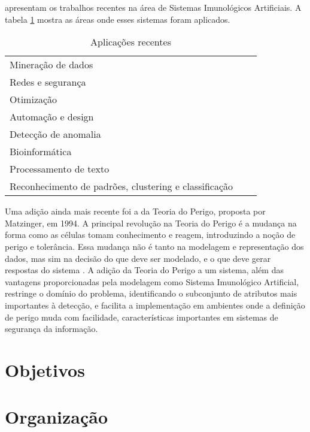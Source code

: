 \citet{Dasgupta2010} apresentam os trabalhos recentes na área de Sistemas Imunológicos Artificiais. A tabela \ref{ais:applications} mostra as áreas onde esses sistemas foram aplicados.

\begin{table}[h!]
    \vspace{1cm}
    \centering
    \caption{Aplicações recentes \cite{Dasgupta2010}}
    \begin{tabular}{l c r}
        \\
        \hline
        Mineração de dados                                    \\
        Redes e segurança                                     \\
        Otimização                                            \\
        Automação e design                                    \\
        Detecção de anomalia                                  \\
        Bioinformática                                        \\
        Processamento de texto                                \\
        Reconhecimento de padrões, clustering e classificação \\
        \hline
    \end{tabular}
    \label{ais:applications}
    \vspace{1cm}
\end{table}

Uma adição ainda mais recente foi a da Teoria do Perigo, proposta por Matzinger, em 1994. A principal revolução na Teoria do Perigo é a mudança na forma como as células tomam conhecimento e reagem, introduzindo a noção de perigo e tolerância. Essa mudança não é tanto na modelagem e representação dos dados, mas sim na decisão do que deve ser modelado, e o que deve gerar respostas do sistema \cite{Aickelin2005}. A adição da Teoria do Perigo a um sistema, além das vantagens proporcionadas pela modelagem como Sistema Imunológico Artificial, restringe o domínio do problema, identificando o subconjunto de atributos mais importantes à detecção, e facilita a implementação em ambientes onde a definição de perigo muda com facilidade, características importantes em sistemas de segurança da informação.

\section{Objetivos}
\section{Organização}
